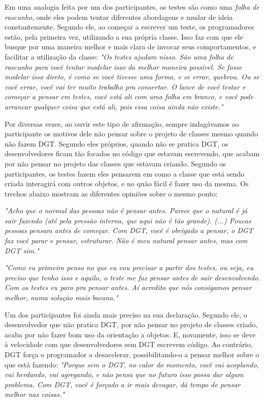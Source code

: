 Em uma analogia feita por um dos participantes, os testes são como uma 
\textit{folha de rascunho}, 
onde eles podem tentar diferentes abordagens e mudar de ideia constantemente. Segundo ele,
ao começar a escrever um teste, os programadores estão, pela primeira vez, utilizando a sua 
própria classe. Isso faz com que ele busque por uma maneira melhor e mais clara de invocar
seus comportamentos, e facilitar a utilização da classe:
\textit{"Os testes ajudam nisso. São uma folha de rascunho para você tentar modelar
isso da melhor maneira possível. Se fosse modelar isso direto, é como se você tivesse
uma forma, e se errar, quebrou. Ou se você errar, você vai ter muito trabalho pra consertar.
O lance de você testar e começar a pensar em testes, você está ali com uma folha em branco,
e você pode arrancar qualquer coisa que está ali, pois essa coisa ainda não existe."}

Por diversas vezes, ao ouvir este tipo de afirmação, sempre indagávamos ao participante
os motivos dele não pensar sobre o projeto de classes mesmo quando não fazem DGT. 
Segundo eles próprios, quando não se pratica DGT, os desenvolvedores ficam
tão focados no código que estavam escrevendo, que acabam por não pensar no
projeto das classes que estavam criando. Segundo os participantes, os testes fazem eles pensarem
em como a classe que está sendo criada interagirá com outros objetos, e no quão
fácil é fazer uso da mesma.
Os trechos abaixo mostram as diferentes opiniões sobre o mesmo ponto:

\textit{"Acho que o normal das pessoas não é pensar antes. Parece que o natural
é já sair fazendo (até pela pressão interna, que aqui não é tão grande). (...) Poucas pessoas pensam
antes de começar. Com DGT, você é obrigado a pensar, o DGT faz você parar e pensar, estruturar. Não
é meu natural pensar antes, mas com DGT sim."}

\textit{"Como eu primeiro penso no que eu vou precisar a partir dos testes, ou seja, eu preciso que tenho
isso e aquilo, o teste me faz pensar antes de sair desenvolvendo. Com os testes eu paro pra pensar antes.
Aí acredito que nós consigamos pensar melhor, numa solução mais bacana."}

Um dos participantes foi ainda mais preciso na sua declaração. Segundo ele, o desenvolvedor que não pratica
DGT, por não pensar no projeto de classes criado, acaba por não fazer bom uso da orientação a objetos.
E, novamente, isso se deve à velocidade com que desenvolvedores sem DGT escrevem código. Ao contrário,
DGT força o programador a desacelerar, possibilitando-o a pensar melhor sobre o que está fazendo:
\textit{"Porque sem o DGT, no calor do momento, você vai acoplando, vai herdando, vai agregando, e não pensa
que no futuro isso possa dar algum problema. Com DGT, você é forçado a ir mais devagar, dá tempo de pensar melhor nas
coisas."}

